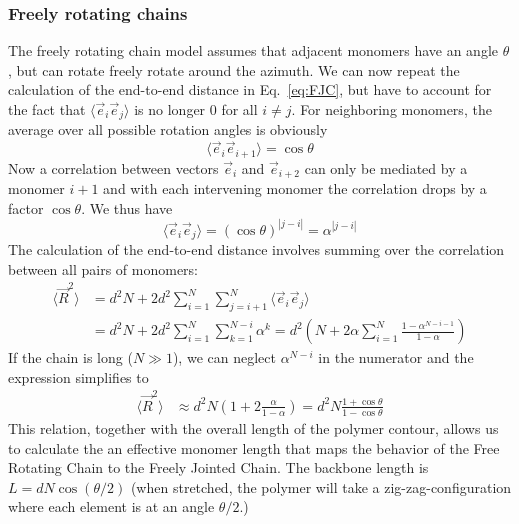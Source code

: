 \subsubsection*{Freely rotating chains}
The freely rotating chain model assumes that adjacent monomers have an angle $\theta$, but can rotate freely rotate around the azimuth.
We can now repeat the calculation of the end-to-end distance in Eq.~\ref{eq:FJC}, but have to account for the fact that $\langle \vec{e}_i\vec{e}_j \rangle$ is no longer 0 for all $i\neq j$.
For neighboring monomers, the average over all possible rotation angles is obviously
\begin{equation}
	\langle \vec{e}_i\vec{e}_{i+1} \rangle = \cos \theta
\end{equation}
Now a correlation between vectors $\vec{e}_i$ and $\vec{e}_{i+2}$ can only be mediated by a monomer $i+1$ and with each intervening monomer the correlation drops by a factor $\cos \theta$.
We thus have
\begin{equation}
	\langle \vec{e}_i\vec{e}_{j} \rangle = \left(\cos \theta\right)^{|j-i|} = \alpha^{|j-i|}
\end{equation}
The calculation of the end-to-end distance involves summing over the correlation between all pairs of monomers:
\begin{equation}
\begin{split}
\label{eq:FRC}
	\langle \vec{R}^2 \rangle &= d^2 N + 2d^2\sum_{i=1}^{N}\sum_{j=i+1}^N \langle \vec{e}_i\vec{e}_j \rangle  \\
	&  =d^2 N + 2d^2\sum_{i=1}^{N}\sum_{k=1}^{N-i} \alpha^k = d^2 \left(N + 2\alpha\sum_{i=1}^N \frac{1-\alpha^{N-i-1}}{1-\alpha}\right)
\end{split}
\end{equation}
If the chain is long ($N\gg1$), we can neglect $\alpha^{N-i}$ in the numerator and the expression simplifies to
\begin{equation}
\begin{split}
\label{eq:FRC_approx}
	\langle \vec{R}^2 \rangle &\approx d^2 N \left(1 + 2\frac{\alpha}{1-\alpha}\right) = d^2 N \frac{1+\cos\theta}{1-\cos \theta}
\end{split}
\end{equation}
This relation, together with the overall length of the polymer contour, allows us to calculate the an effective monomer length that maps the behavior of the Free Rotating Chain to the Freely Jointed Chain.
The backbone length is $L = dN \cos (\theta/2)$ (when stretched, the polymer will take a zig-zag-configuration where each element is at an angle $\theta/2$.)
